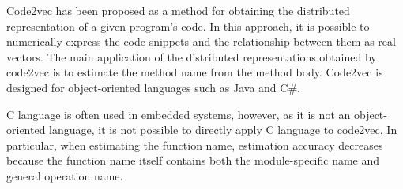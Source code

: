 \documentclass[JIP]{apris}
\begin{document}
Code2vec\cite{alon2019code2vec} has been proposed as a method for obtaining the distributed representation of a given program’s code. In this approach, it is possible to numerically express the code snippets and the relationship between them as real vectors. The main application of the distributed representations obtained by code2vec is to estimate the method name from the method body. Code2vec is designed for object-oriented languages such as Java and C\#. 

C language is often used in embedded systems, however, as it is not an object-oriented language, it is not possible to directly apply C language to code2vec. In particular, when estimating the function name, estimation accuracy decreases because the function name itself contains both the module-specific name and general operation name.
\end{document}
